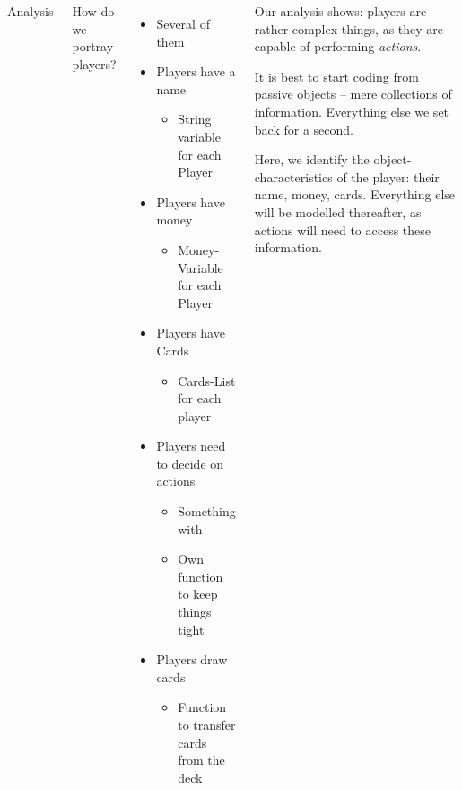 \begin{frame}[fragile]
%
%
\begin{columns}[T]
\begin{Large}
	{Analysis}
\end{Large}

How do we portray players?
\begin{itemize}
\item Several of them \Thus {}
\item Players have a name
	\begin{itemize}
	\item[\Thus] String variable for each Player
	\end{itemize}
\item Players have money
	\begin{itemize}
	\item[\Thus] Money-Variable for each Player
	\end{itemize}
\item Players have Cards
	\begin{itemize}
	\item[\Thus] Cards-List for each player
	\end{itemize}
\item Players need to decide on actions
	\begin{itemize}
	\item[\Thus] Something with 
	\item[\Thus] Own function to keep things tight
	\end{itemize}
\item Players draw cards
	\begin{itemize}
	\item[\Thus] Function to transfer cards from the deck
	\end{itemize}
\end{itemize}
%
\begin{hintbox}
Our analysis shows: players are rather complex things, as they are capable of performing \emph{actions}.

It is best to start coding from passive objects -- mere collections of information. Everything else we set back for a second.

Here, we identify the object-characteristics of the player: their name, money, cards. Everything else will be modelled thereafter, as actions will need to access these information.
\end{hintbox}
\end{columns}
%
\end{frame}
	
